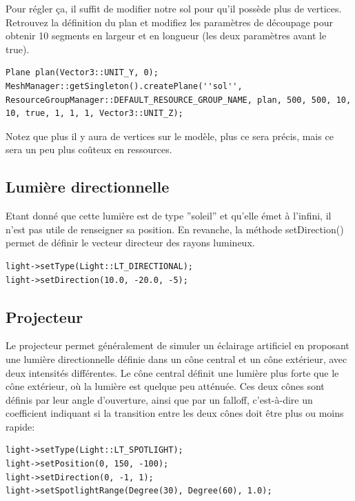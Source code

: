 \documentclass[10pt,a4paper]{report}
\begin{document}
Pour r\'egler \c{c}a, il suffit de modifier notre sol pour qu'il poss\`ede plus de vertices. Retrouvez la d\'efinition du plan et modifiez les param\`etres de d\'ecoupage pour obtenir 10 segments en largeur et en longueur (les deux param\`etres avant le true).

\begin{lstlisting}
Plane plan(Vector3::UNIT_Y, 0);
MeshManager::getSingleton().createPlane(''sol'', ResourceGroupManager::DEFAULT_RESOURCE_GROUP_NAME, plan, 500, 500, 10, 10, true, 1, 1, 1, Vector3::UNIT_Z);
\end{lstlisting}



Notez que plus il y aura de vertices sur le mod\`ele, plus ce sera pr\'ecis, mais ce sera un peu plus co\^uteux en ressources.




\subsection{Lumi\`ere directionnelle}

Etant donn\'e que cette lumi\`ere est de type ''soleil'' et qu'elle \'emet \`{a} l'infini, il n'est pas utile de renseigner sa position. En revanche, la m\'ethode setDirection() permet de d\'efinir le vecteur directeur des rayons lumineux.

\begin{lstlisting}
light->setType(Light::LT_DIRECTIONAL);
light->setDirection(10.0, -20.0, -5);
\end{lstlisting}






\subsection{Projecteur}

Le projecteur permet g\'en\'eralement de simuler un \'eclairage artificiel en proposant une lumi\`ere directionnelle d\'efinie dans un c\^one central et un c\^one ext\'erieur, avec deux intensit\'es diff\'erentes. Le c\^one central d\'efinit une lumi\`ere plus forte que le c\^one ext\'erieur, o\`{u} la lumi\`ere est quelque peu att\'enu\'ee. Ces deux c\^ones sont d\'efinis par leur angle d'ouverture, ainsi que par un falloff, c'est-\`{a}-dire un coefficient indiquant si la transition entre les deux c\^ones doit \^etre plus ou moins rapide:
\begin{lstlisting}
light->setType(Light::LT_SPOTLIGHT);
light->setPosition(0, 150, -100);
light->setDirection(0, -1, 1);
light->setSpotlightRange(Degree(30), Degree(60), 1.0);
\end{lstlisting}
\end{document}
